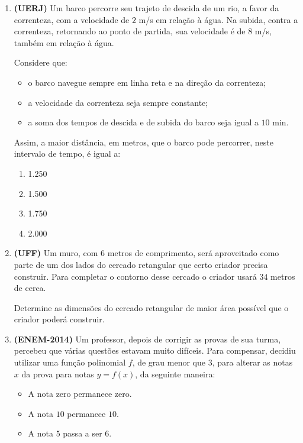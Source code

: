 \begin{enumerate}
\item \textbf{(UERJ)} Um barco percorre seu trajeto de descida de um rio, a favor da correnteza, com a velocidade de \(2\) m/s em relação à água. Na subida, contra a correnteza, retornando ao ponto de partida, sua velocidade é de \(8\) m/s, também em relação à água.

Considere que:
\begin{itemize}
\item {} 
o barco navegue sempre em linha reta e na direção da correnteza;

\item {} 
a velocidade da correnteza seja sempre constante;

\item {} 
a soma dos tempos de descida e de subida do barco seja igual a \(10\) min.

\end{itemize}

Assim, a maior distância, em metros, que o barco pode percorrer, neste intervalo de tempo, é igual a:

\begin{enumerate}
\item 1.250
\item 1.500
\item 1.750
\item 2.000 
\end{enumerate}

\item \textbf{(UFF)} Um muro, com \(6\) metros de comprimento, será aproveitado como parte de um dos lados do cercado retangular que certo criador precisa construir. Para completar o contorno desse cercado o criador usará \(34\) metros de cerca.

Determine as dimensões do cercado retangular de maior área possível que o criador poderá construir.

\item \textbf{(ENEM-2014)} Um professor, depois de corrigir as provas de sua turma, percebeu que várias questões estavam muito difíceis. Para compensar, decidiu utilizar uma função polinomial \(f\), de grau menor que \(3\), para alterar as notas \(x\) da prova para notas \(y = f(x)\), da seguinte maneira:
\begin{itemize}
\item {} 
A nota zero permanece zero.

\item {} 
A nota \(10\) permanece \(10\).

\item {} 
A nota \(5\) passa a ser \(6\).


\end{itemize}
\end{enumerate}

